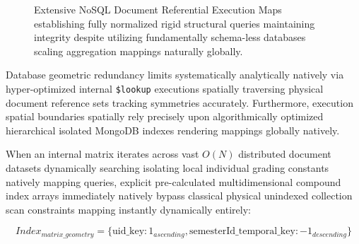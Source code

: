 \documentclass[journal,onecolumn,10pt,draftclsnofoot]{IEEEtran}
\begin{document}
\begin{figure}[H]
\caption{Extensive NoSQL Document Referential Execution Maps establishing fully normalized rigid structural queries maintaining integrity despite utilizing fundamentally schema-less databases scaling aggregation mappings naturally globally.}
\label{fig:er}
\end{figure}
\vspace{0.8cm}

Database geometric redundancy limits systematically analytically natively via hyper-optimized internal \texttt{\$lookup} executions spatially traversing physical document reference sets tracking symmetries accurately. Furthermore, execution spatial boundaries spatially rely precisely upon algorithmically optimized hierarchical isolated MongoDB indexes rendering mappings globally natively.

When an internal matrix iterates across vast $O(N)$ distributed document datasets dynamically searching isolating local individual grading constants natively mapping queries, explicit pre-calculated multidimensional compound index arrays immediately natively bypass classical physical unindexed collection scan constraints mapping instantly dynamically entirely:

\begin{equation}
    Index_{matrix\_geometry} = \{ \text{uid\_key}: 1_{ascending}, \text{semesterId\_temporal\_key}: -1_{descending} \} 
\end{equation}
\end{document}
